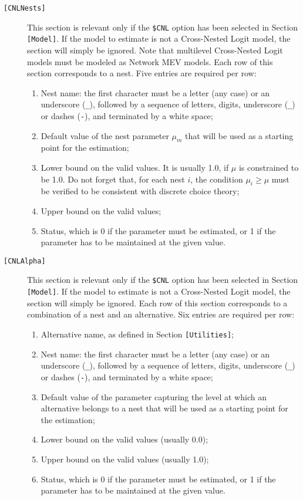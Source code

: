 \documentclass[12pt,a4paper]{article}
\newcommand{\specitem}[1]{\texttt{[#1]}}
\begin{document}
\begin{description}
   \item[\specitem{CNLNests}]  This section is relevant only if the
      \verb+$CNL+ option has been selected in Section
      \verb+[Model]+. If the model to estimate is not a Cross-Nested
      Logit model, the section will simply be
       ignored.  Note that multilevel Cross-Nested Logit models must be modeled as Network MEV models.
      Each row of this section corresponds to a nest. Five entries are required per row:
      \begin{enumerate}
         \item Nest name:   the first character must be a letter (any case) or an underscore
            (\verb+_+), followed by a sequence of letters, digits, underscore (\verb+_+)
            or dashes (\verb+-+), and terminated by a white space;
         \item Default value of the nest parameter $\mu_m$ that will be used as a starting point for the estimation;
         \item Lower bound on the valid values. It is usually 1.0, if $\mu$ is
            constrained to be 1.0. Do not forget that, for each nest $i$, the condition
            $\mu_i \geq \mu$ must be verified to be consistent with discrete choice
            theory;
         \item Upper bound on the valid values;
         \item Status, which is 0 if the parameter must be estimated, or 1 if the parameter has to be maintained at the given value. 
      \end{enumerate}

   \item[\specitem{CNLAlpha}]  This section is relevant only if the
      \verb+$CNL+ option has been selected in Section
      \verb+[Model]+. If the model to estimate is not a Cross-Nested
      Logit model, the section will simply be
       ignored. 
      Each row of this section corresponds to a combination of a nest and an alternative. Six entries are required per row:
      \begin{enumerate}
         \item Alternative name, as defined in Section \verb+[Utilities]+;
         \item Nest name:   the first character must be a letter (any case) or an underscore
            (\verb+_+), followed by a sequence of letters, digits, underscore (\verb+_+)
            or dashes (\verb+-+), and terminated by a white space;
         \item Default value of the  parameter capturing the level at which an alternative belongs to a nest that will be used as a starting point for the estimation;
         \item Lower bound on the valid values (usually 0.0);
         \item Upper bound on the valid values (usually 1.0);
         \item Status, which is 0 if the parameter must be estimated, or 1 if the parameter has to be maintained at the given value. 
      \end{enumerate}


\end{description}
\end{document}
